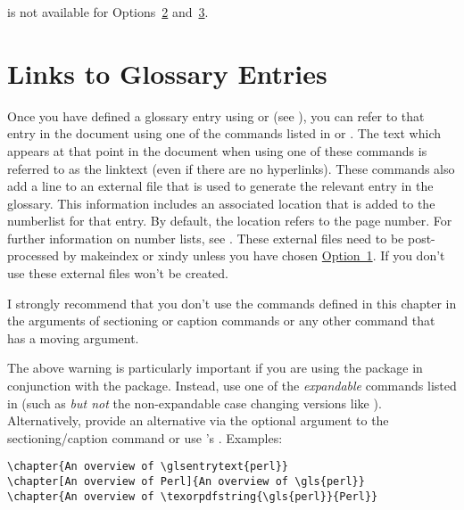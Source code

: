 \documentclass[report,inlinetitle]{nlctdoc}
\newcommand*{\opt}[1]{\hyperlink{option#1}{Option~#1}}
\newcommand*{\optsand}[2]{Options~\hyperlink{option#1}{#1}
and~\hyperlink{option#2}{#2}}
\begin{document}
\begin{important}
 is not available for \optsand23.
\end{important}

\chapter{Links to Glossary Entries}
\label{sec:glslink}

Once you have defined a glossary entry using 
or  (see ),
you can refer to that entry in the document using one of the
commands listed in  or
. The text which appears at that
point in the document when using one of these commands is referred
to as the \gls{linktext} (even if there are no hyperlinks). These
commands also add a line to an external file that is
used to generate the relevant entry in the glossary. This
information includes an associated location that is added to the
\gls{numberlist} for that entry. By default, the location refers to
the page number. For further information on number lists, see
.  These external files need to be
post-processed by \gls{makeindex} or \gls{xindy} unless you have
chosen \opt1. If you don't use  these external
files won't be created.

\begin{important}
I strongly recommend that you don't use the commands
defined in this chapter in the arguments of sectioning or caption
commands or any other command that has a moving argument.
\end{important}

The above warning is particularly important if you are using the
 package in conjunction with the 
package. Instead, use one of the \emph{expandable} commands listed in
 (such as  \emph{but
not} the non-expandable
case changing versions like ). Alternatively, provide an
alternative via the optional argument to the sectioning\slash caption
command or use 's . Examples:
\begin{verbatim}
\chapter{An overview of \glsentrytext{perl}}
\chapter[An overview of Perl]{An overview of \gls{perl}}
\chapter{An overview of \texorpdfstring{\gls{perl}}{Perl}}
\end{verbatim}
\end{document}
